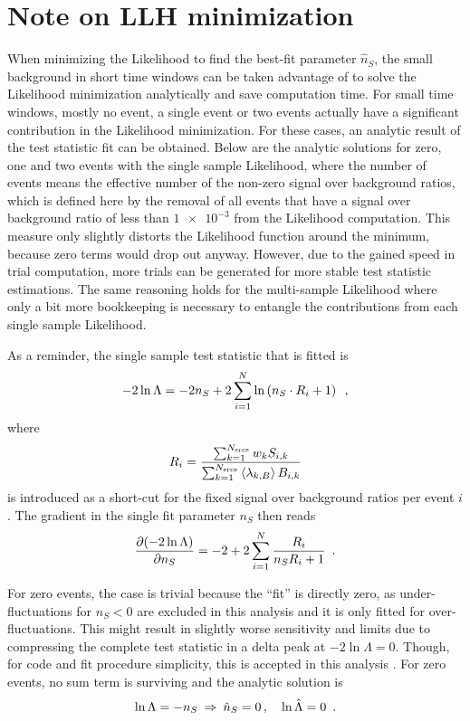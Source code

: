 \section{Note on LLH minimization}
When minimizing the Likelihood to find the best-fit parameter $\hat{n}_S$, the small background in short time windows can be taken advantage of to solve the Likelihood minimization analytically and save computation time.
For small time windows, mostly no event, a single event or two events actually have a significant contribution in the Likelihood minimization.
For these cases, an analytic result of the test statistic fit can be obtained.
Below are the analytic solutions for zero, one and two events with the single sample Likelihood, where the number of events means the effective number of the non-zero signal over background ratios, which is defined here by the removal of all events that have a signal over background ratio of less than $\num{1e-3}$ from the Likelihood computation.
This measure only slightly distorts the Likelihood function around the minimum, because zero terms would drop out anyway.
However, due to the gained speed in trial computation, more trials can be generated for more stable test statistic estimations.
The same reasoning holds for the multi-sample Likelihood where only a bit more bookkeeping is necessary to entangle the contributions from each single sample Likelihood.

As a reminder, the single sample test statistic that is fitted is
\begin{equation}
  -2\ln\Lambda
  = -2n_S + 2\sum_{i=1}^N \ln\left(n_S \cdot R_i + 1\right)
  \enspace\text{,}
\end{equation}
where
\begin{equation}
  R_i = \frac{\sum_{k=1}^{N_\text{srcs}} w_k S_{i,k}}
             {\sum_{k=1}^{N_\text{srcs}}\Braket{\lambda_{k,B}} B_{i,k}}
\end{equation}
is introduced as a short-cut for the fixed signal over background ratios per event $i$.
The gradient in the single fit parameter $n_S$ then reads
\begin{equation}
  \frac{\partial (-2\ln\Lambda)}{\partial n_S}
  = -2 + 2\sum_{i=1}^N \frac{R_i}{n_S R_i + 1}
  \enspace\text{.}
\end{equation}

For zero events, the case is trivial because the \enquote{fit} is directly zero, as under-fluctuations for $n_S < 0$ are excluded in this analysis and it is only fitted for over-fluctuations.
This might result in slightly worse sensitivity and limits due to compressing the complete test statistic in a delta peak at $-2\ln\Lambda=0$.
Though, for code and fit procedure simplicity, this is accepted in this analysis \cite{Aartsen:2016lir}.
For zero events, no sum term is surviving and the analytic solution is
\begin{equation}
  \ln\Lambda = -n_S
  \enspace\text{$\Rightarrow$}\enspace
  \hat{n}_S = 0 \, ,\quad \ln\hat{\Lambda} = 0
  \enspace\text{.}
\end{equation}

